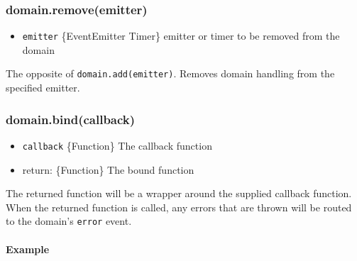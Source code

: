 \subsubsection{domain.remove(emitter)}

\begin{itemize}
\item
  \texttt{emitter} \{EventEmitter \textbar{} Timer\} emitter or timer to
  be removed from the domain
\end{itemize}

The opposite of \texttt{domain.add(emitter)}. Removes domain handling
from the specified emitter.

\subsubsection{domain.bind(callback)}

\begin{itemize}
\item
  \texttt{callback} \{Function\} The callback function
\item
  return: \{Function\} The bound function
\end{itemize}

The returned function will be a wrapper around the supplied callback
function. When the returned function is called, any errors that are
thrown will be routed to the domain's \texttt{error} event.

\paragraph{Example}

\begin{Shaded}
\begin{Highlighting}[]
 \NormalTok{();}

 
  \NormalTok{, }\NormalTok{(}
     
  \NormalTok{\}));}
\NormalTok{\}}

\NormalTok{(}\NormalTok{, }
\NormalTok{\});}
\end{Highlighting}
\end{Shaded}

